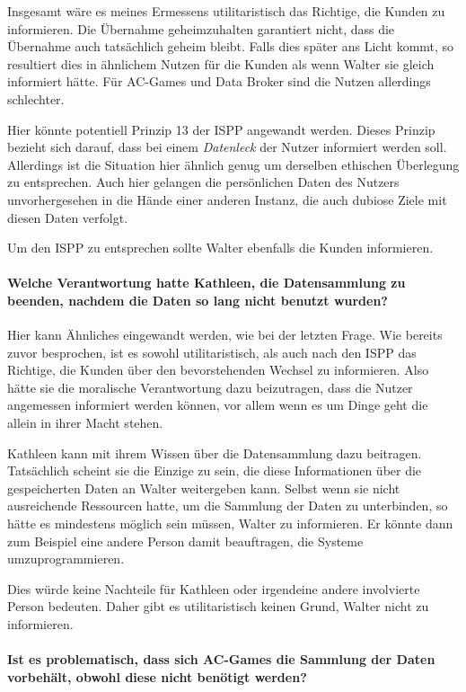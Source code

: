 Insgesamt wäre es meines Ermessens utilitaristisch das Richtige, die Kunden zu informieren.
Die Übernahme geheimzuhalten garantiert nicht, dass die Übernahme auch tatsächlich geheim bleibt.
Falls dies später ans Licht kommt, so resultiert dies in ähnlichem Nutzen für die Kunden als wenn Walter sie gleich informiert hätte.
Für AC-Games und Data Broker sind die Nutzen allerdings schlechter.

Hier könnte potentiell Prinzip 13 der ISPP angewandt werden. Dieses Prinzip bezieht sich darauf, dass bei einem \emph{Datenleck} der Nutzer informiert werden soll. Allerdings ist die Situation hier ähnlich genug um derselben ethischen Überlegung zu entsprechen.
Auch hier gelangen die persönlichen Daten des Nutzers unvorhergesehen in die Hände einer anderen Instanz, die auch dubiose Ziele mit diesen Daten verfolgt.

Um den ISPP zu entsprechen sollte Walter ebenfalls die Kunden informieren.

\paragraph*{Welche Verantwortung hatte Kathleen, die Datensammlung zu beenden, nachdem die Daten so lang nicht benutzt wurden? \cite{kees_faites_2017}}

Hier kann Ähnliches eingewandt werden, wie bei der letzten Frage.
Wie bereits zuvor besprochen, ist es sowohl utilitaristisch, als auch nach den ISPP das Richtige, die Kunden über den bevorstehenden Wechsel zu informieren.
Also hätte sie die moralische Verantwortung dazu beizutragen, dass die Nutzer angemessen informiert werden können, vor allem wenn es um Dinge geht die allein in ihrer Macht stehen.

Kathleen kann mit ihrem Wissen über die Datensammlung dazu beitragen.
Tatsächlich scheint sie die Einzige zu sein, die diese Informationen über die gespeicherten Daten an Walter weitergeben kann.
Selbst wenn sie nicht ausreichende Ressourcen hatte, um die Sammlung der Daten zu unterbinden, so hätte es mindestens möglich sein müssen, Walter zu informieren.
Er könnte dann zum Beispiel eine andere Person damit beauftragen, die Systeme umzuprogrammieren.

Dies würde keine Nachteile für Kathleen oder irgendeine andere involvierte Person bedeuten. 
Daher gibt es utilitaristisch keinen Grund, Walter nicht zu informieren.

\paragraph{Ist es problematisch, dass sich AC-Games die Sammlung der Daten vorbehält, obwohl diese nicht benötigt werden?}

